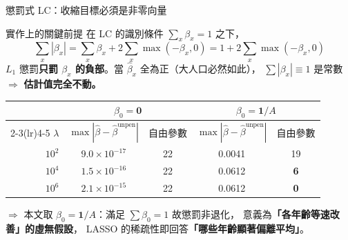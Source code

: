 \documentclass[aspectratio=169, UTF8, fontset=macnew, 11pt]{ctexbeamer}
\newcommand{\hi}[1]{\textcolor{red!70!black}{\textbf{#1}}}
\newcommand{\gd}[1]{\textcolor{green!45!black}{\textbf{#1}}}
\begin{document}
\begin{frame}{懲罰式 LC：收縮目標必須是非零向量}
\begin{alertblock}{實作上的關鍵前提}
\small
在 LC 的識別條件 $\sum_x\beta_x=1$ 之下，
\[
\sum_x|\beta_x|=\sum_x\beta_x+2\sum_x\max(-\beta_x,0)=1+2\sum_x\max(-\beta_x,0)
\]
$L_1$ 懲罰\hi{只罰 $\beta_x$ 的負部}。當 $\hat\beta_x$ 全為正（大人口必然如此），
$\sum|\beta_x|\equiv1$ 是常數 $\Rightarrow$ \hi{估計值完全不動。}
\end{alertblock}
\vspace{2pt}
\begin{center}\scriptsize
\begin{tabular}{rcccc}
\toprule
& \multicolumn{2}{c}{$\beta_0=\mathbf{0}$} & \multicolumn{2}{c}{$\beta_0=\mathbf{1}/A$}\\
\cmidrule(lr){2-3}\cmidrule(lr){4-5}
$\lambda$ & $\max|\hat\beta-\hat\beta^{\text{unpen}}|$ & 自由參數
          & $\max|\hat\beta-\hat\beta^{\text{unpen}}|$ & 自由參數\\
\midrule
$10^2$ & \hi{$9.0\times10^{-17}$} & 22 & 0.0041 & 19\\
$10^4$ & \hi{$1.5\times10^{-16}$} & 22 & 0.0612 & \gd{6}\\
$10^6$ & \hi{$2.1\times10^{-15}$} & 22 & 0.0612 & \gd{0}\\
\bottomrule
\end{tabular}
\end{center}
\vspace{3pt}
\footnotesize
$\Rightarrow$ 本文取 $\beta_0=\mathbf{1}/A$：滿足 $\sum\beta_0=1$ 故懲罰非退化，
意義為\gd{「各年齡等速改善」的虛無假設}，
LASSO 的稀疏性即回答\gd{「哪些年齡顯著偏離平均」}。
\end{frame}
\end{document}
